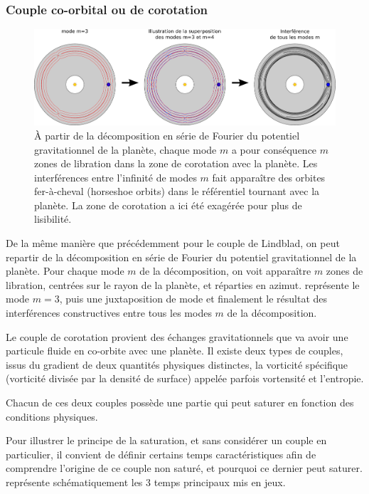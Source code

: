 \subsubsection{Couple co-orbital ou de corotation}\label{sec:couple-corotation}
\begin{figure}[htbp]
\centering
\includegraphics[width=\linewidth]{figure/corotation_modes.pdf}
\caption[Zone de corotation d'une planète.]{À partir de la décomposition en série de Fourier du potentiel
gravitationnel de la planète, chaque mode $m$ a pour conséquence $m$ zones de libration dans la zone de corotation avec la
planète. Les interférences entre l'infinité de modes $m$ fait apparaître des orbites fer-à-cheval (\og horseshoe orbits\fg) dans
le référentiel tournant avec la planète. La zone de corotation a ici été exagérée pour plus de
lisibilité.}\label{fig:corotation_torque}
\end{figure}

De la même manière que précédemment pour le couple de Lindblad, on peut repartir de la décomposition en série de Fourier du potentiel gravitationnel de la planète. Pour chaque mode $m$ de la décomposition, on voit apparaître $m$ zones de libration, centrées sur le rayon de la planète, et réparties en azimut.  représente le mode $m=3$, puis une juxtaposition de mode et finalement le résultat des interférences constructives entre tous les modes $m$ de la décomposition.


Le couple de corotation provient des échanges gravitationnels que va avoir une particule fluide en co-orbite avec une planète. Il existe deux types de couples, issus du gradient de deux quantités physiques distinctes, la vorticité spécifique (vorticité divisée par la densité de surface) appelée parfois vortensité et l'entropie. 

Chacun de ces deux couples possède une partie qui peut saturer en fonction des conditions physiques. 

Pour illustrer le principe de la saturation, et sans considérer un couple en particulier, il convient de définir certains temps caractéristiques afin de comprendre l'origine de ce couple non saturé, et pourquoi ce dernier peut saturer.  représente schématiquement les 3 temps principaux mis en jeux. 

